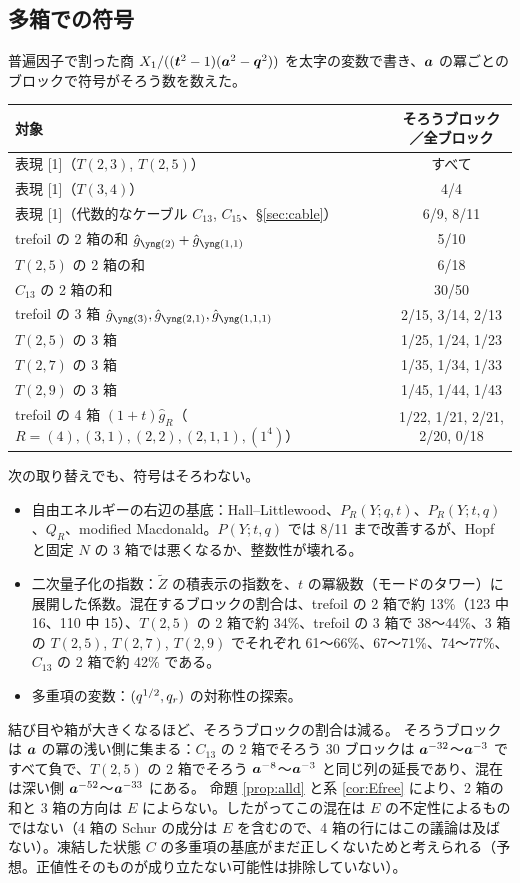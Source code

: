 \subsection{多箱での符号}
\begin{compresult}\label{cr:signs}
普遍因子で割った商 $X_1/((\bm{t}^2-1)(\bm{a}^2-\bm{q}^2))$ を太字の変数で書き、$\bm{a}$ の冪ごとのブロックで符号がそろう数を数えた。
\begin{center}
\begin{tabular}{lc}
\toprule
対象 & そろうブロック／全ブロック \\
\midrule
表現 [1]（$T(2,3)$, $T(2,5)$） & すべて \\
表現 [1]（$T(3,4)$） & 4/4 \\
表現 [1]（代数的なケーブル $C_{13}$, $C_{15}$、§\ref{sec:cable}） & 6/9, 8/11 \\
trefoil の 2 箱の和 $\hat g_{\ytwo} + \hat g_{\yoneone}$ & 5/10 \\
$T(2,5)$ の 2 箱の和 & 6/18 \\
$C_{13}$ の 2 箱の和 & 30/50 \\
trefoil の 3 箱 $\hat g_{\ythree}, \hat g_{\ytwoone}, \hat g_{\yoneoneone}$ & 2/15, 3/14, 2/13 \\
$T(2,5)$ の 3 箱 & 1/25, 1/24, 1/23 \\
$T(2,7)$ の 3 箱 & 1/35, 1/34, 1/33 \\
$T(2,9)$ の 3 箱 & 1/45, 1/44, 1/43 \\
trefoil の 4 箱 $(1+t)\hat g_R$（$R = (4), (3,1), (2,2), (2,1,1), (1^4)$） & 1/22, 1/21, 2/21, 2/20, 0/18 \\
\bottomrule
\end{tabular}
\end{center}
次の取り替えでも、符号はそろわない。
\begin{itemize}
\item 自由エネルギーの右辺の基底：Hall--Littlewood、$P_R(Y; q, t)$、$P_R(Y; t, q)$、$Q_R$、modified Macdonald。$P(Y;t,q)$ では 8/11 まで改善するが、Hopf と固定 $N$ の 3 箱では悪くなるか、整数性が壊れる。
\item 二次量子化の指数：$\tilde Z$ の積表示の指数を、$t$ の冪級数（モードのタワー）に展開した係数。混在するブロックの割合は、trefoil の 2 箱で約 13\%（123 中 16、110 中 15）、$T(2,5)$ の 2 箱で約 34\%、trefoil の 3 箱で 38〜44\%、3 箱の $T(2,5)$, $T(2,7)$, $T(2,9)$ でそれぞれ 61〜66\%、67〜71\%、74〜77\%、$C_{13}$ の 2 箱で約 42\% である。
\item 多重項の変数：$(q^{1/2}, q_r)$ の対称性の探索。
\end{itemize}
\end{compresult}
結び目や箱が大きくなるほど、そろうブロックの割合は減る。
そろうブロックは $\bm{a}$ の冪の浅い側に集まる：$C_{13}$ の 2 箱でそろう 30 ブロックは $\bm{a}^{-32}$〜$\bm{a}^{-3}$ ですべて負で、$T(2,5)$ の 2 箱でそろう $\bm{a}^{-8}$〜$\bm{a}^{-3}$ と同じ列の延長であり、混在は深い側 $\bm{a}^{-52}$〜$\bm{a}^{-33}$ にある。
命題 \ref{prop:alld} と系 \ref{cor:Efree} により、2 箱の和と 3 箱の方向は $E$ によらない。したがってこの混在は $E$ の不定性によるものではない（4 箱の Schur の成分は $E$ を含むので、4 箱の行にはこの議論は及ばない）。凍結した状態 $C$ の多重項の基底がまだ正しくないためと考えられる（予想。正値性そのものが成り立たない可能性は排除していない）。

